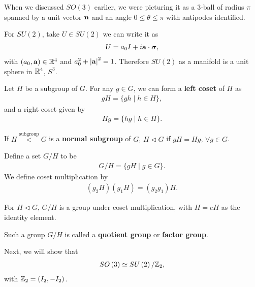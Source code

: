 When we discussed $SO \left( 3 \right) $ earlier, we were picturing it as a 3-ball of radius $\pi$ spanned by a unit vector $\vb{n}$ and an angle $0 \leq \theta \leq \pi$ with antipodes identified.

For $SU \left( 2 \right) $, take $U \in SU \left( 2 \right) $ we can write it as
\begin{align}
    U = a_0 I + i \vb{a} \cdot \boldsymbol{\sigma}
,\end{align}
with $\left( a_0, \vb{a} \right) \in \mathbb{R}^{4}$ and $a_0^2 + \left| \vb{a} \right|^2 = 1$. Therefore $SU\left( 2 \right) $ as a manifold is a unit sphere in $\mathbb{R}^{4}$, $S^{3}$.

\begin{definition}
    Let $H$ be a subgroup of $G$. For any $g \in G$, we can form a \textbf{left coset} of $H$ as
    \begin{align}
        g H = \{g h  \mid h \in H\} 
    ,\end{align}
    and a right coset given by
    \begin{align}
        Hg = \{hg  \mid  h \in H\} 
    .\end{align}
\end{definition}

\begin{definition}
    If $H \overset{\text{subgroup}}{<} G$ is a \textbf{normal subgroup} of $G$, $H \triangleleft G$ if $g H = Hg$, $\forall g \in G$.
\end{definition}

\begin{definition}
    Define a set $G / H$ to be
    \begin{align}
        G / H = \{g H  \mid g \in G\} 
    .\end{align}
    We define coset multiplication by
    \begin{align}
        \left( g_2H  \right) \left( g_1 H \right)  = \left( g_2 g_1 \right) H
    .\end{align}
\end{definition}

\begin{theorem}
    For $H \triangleleft G$, $G / H$ is a group under coset multiplication, with $H = e H$ as the identity element.
\end{theorem}

\begin{definition}
    Such a group $G / H$ is called a \textbf{quotient group} or \textbf{factor group}.
\end{definition}

Next, we will show that
\begin{align}
    SO \left( 3 \right) \simeq SU \left( 2 \right) / \mathbb{Z}_2
,\end{align}
with $\mathbb{Z}_2 = \left( I_2, -I_2 \right) $.
